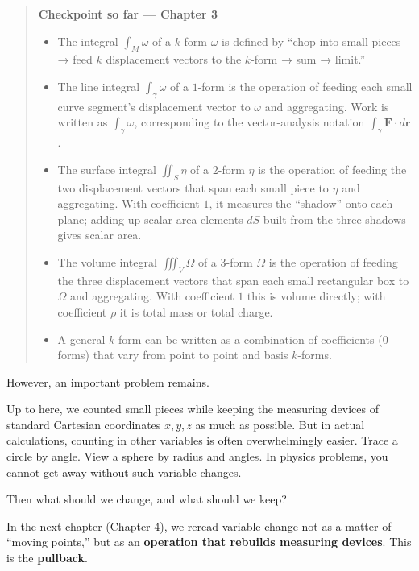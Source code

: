 \documentclass[a4paper,12pt,openany]{book}
\begin{document}
\begin{quote}
\textbf{Checkpoint so far — Chapter 3}

\begin{itemize}
\item
  The integral \(\int_M \omega\) of a \(k\)-form \(\omega\) is defined
  by ``chop into small pieces → feed \(k\) displacement vectors to the
  \(k\)-form → sum → limit.''
\item
  The line integral \(\int_\gamma \omega\) of a \(1\)-form is the
  operation of feeding each small curve segment's displacement vector to
  \(\omega\) and aggregating. Work is written as \(\int_\gamma \omega\),
  corresponding to the vector-analysis notation
  \(\int_\gamma \mathbf{F}\cdot d\mathbf{r}\).
\item
  The surface integral \(\iint_S \eta\) of a \(2\)-form \(\eta\) is the
  operation of feeding the two displacement vectors that span each small
  piece to \(\eta\) and aggregating. With coefficient \(1\), it measures
  the ``shadow'' onto each plane; adding up scalar area elements \(dS\)
  built from the three shadows gives scalar area.
\item
  The volume integral \(\iiint_V \Omega\) of a \(3\)-form \(\Omega\) is
  the operation of feeding the three displacement vectors that span each
  small rectangular box to \(\Omega\) and aggregating. With coefficient
  \(1\) this is volume directly; with coefficient \(\rho\) it is total
  mass or total charge.
\item
  A general \(k\)-form can be written as a combination of coefficients
  (\(0\)-forms) that vary from point to point and basis \(k\)-forms.
\end{itemize}
\end{quote}

However, an important problem remains.

Up to here, we counted small pieces while keeping the measuring devices
of standard Cartesian coordinates \(x, y, z\) as much as possible. But
in actual calculations, counting in other variables is often
overwhelmingly easier. Trace a circle by angle. View a sphere by radius
and angles. In physics problems, you cannot get away without such
variable changes.

Then what should we change, and what should we keep?

In the next chapter (Chapter 4), we reread variable change not as a
matter of ``moving points,'' but as an
\textbf{operation that rebuilds measuring devices}. This is the
\textbf{pullback}.
\end{document}
